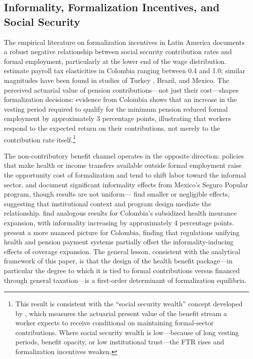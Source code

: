 \documentclass[12pt,a4paper]{article}
\begin{document}
\subsection{Informality, Formalization Incentives, and Social Security}
\label{subsec:lit_informality}

The empirical literature on formalization incentives in Latin America documents a robust negative relationship between social security contribution rates and formal employment, particularly at the lower end of the wage distribution. \citet{Kugler2017} estimate payroll tax elasticities in Colombia ranging between 0.4 and 1.0; similar magnitudes have been found in studies of Turkey \citep{AcarTansel2019}, Brazil, and Mexico. The perceived actuarial value of pension contributions---not just their cost---shapes formalization decisions: evidence from Colombia shows that an increase in the vesting period required to qualify for the minimum pension reduced formal employment by approximately 3 percentage points, illustrating that workers respond to the expected return on their contributions, not merely to the contribution rate itself.\footnote{This result is consistent with the ``social security wealth'' concept developed by \citet{WorldBankInformalizing2025}, which measures the actuarial present value of the benefit stream a worker expects to receive conditional on maintaining formal-sector contributions. Where social security wealth is low---because of long vesting periods, benefit opacity, or low institutional trust---the FTR rises and formalization incentives weaken.}

The non-contributory benefit channel operates in the opposite direction: policies that make health or income transfers available outside formal employment raise the opportunity cost of formalization and tend to shift labor toward the informal sector. \citet{BoschCampos2014} and \citet{AteridoEtAl2011} document significant informality effects from Mexico's Seguro Popular program, though results are not uniform---\citet{AzuaraMarinescu2013} find smaller or negligible effects, suggesting that institutional context and program design mediate the relationship. \citet{CamachoConoverHoyos2013} find analogous results for Colombia's subsidized health insurance expansion, with informality increasing by approximately 4 percentage points. \citet{CalderonMarinescu2012} present a more nuanced picture for Colombia, finding that regulations unifying health and pension payment systems partially offset the informality-inducing effects of coverage expansion. The general lesson, consistent with the analytical framework of this paper, is that the design of the health benefit package---in particular the degree to which it is tied to formal contributions versus financed through general taxation---is a first-order determinant of formalization equilibria.
\end{document}
